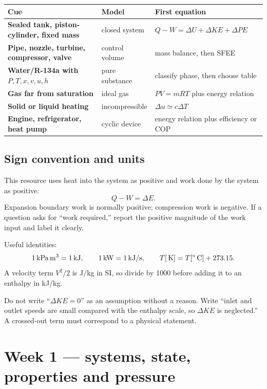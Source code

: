 \documentclass[10pt,a4paper]{article}
\begin{document}
\begin{quick}
\begin{tabularx}{\textwidth}{>{\bfseries}p{}X X}
\toprule Cue & Model & First equation\\\midrule
Sealed tank, piston-cylinder, fixed mass & closed system & $Q-W=\Delta U+\Delta KE+\Delta PE$\\
Pipe, nozzle, turbine, compressor, valve & control volume & mass balance, then SFEE\\
Water/R-134a with $P,T,x,v,u,h$ & pure substance & classify phase, then choose table\\
Gas far from saturation & ideal gas & $PV=mRT$ plus energy relation\\
Solid or liquid heating & incompressible & $\Delta u\simeq c\Delta T$\\
Engine, refrigerator, heat pump & cyclic device & energy relation plus efficiency or COP\\\bottomrule
\end{tabularx}
\end{quick}

\subsection{Sign convention and units}
This resource uses heat into the system as positive and work done by the system as positive:
\[
Q-W=\Delta E.
\]
Expansion boundary work is normally positive; compression work is negative. If a question asks for ``work required,'' report the positive magnitude of the work input and label it clearly.

Useful identities:
\[
1\,\mathrm{kPa\,m^3}=1\,\mathrm{kJ},\qquad 1\,\mathrm{kW}=1\,\mathrm{kJ/s},\qquad T[\,\mathrm{K}]=T[^{\circ}\,\mathrm{C}]+273.15.
\]
A velocity term $V^2/2$ is J/kg in SI, so divide by 1000 before adding it to an enthalpy in kJ/kg.

\begin{trap}
Do not write ``$\Delta KE=0$'' as an assumption without a reason. Write ``inlet and outlet speeds are small compared with the enthalpy scale, so $\Delta KE$ is neglected.'' A crossed-out term must correspond to a physical statement.
\end{trap}

\section{Week 1 --- systems, state, properties and pressure}
\end{document}
